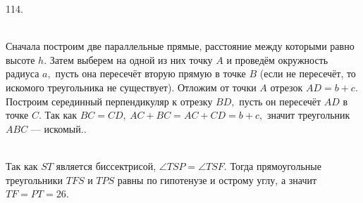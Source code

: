 \documentclass[12pt]{article}
\begin{document}
114. \begin{figure}[ht!]
\end{figure}\\
Сначала построим две параллельные прямые, расстояние между которыми равно высоте $h.$ Затем выберем на одной из них точку $A$ и проведём окружность радиуса $a,$ пусть она пересечёт вторую прямую в точке $B$ (если не пересечёт, то искомого треугольника не существует). Отложим от точки $A$ отрезок $AD=b+c.$ Построим серединный перпендикуляр к отрезку $BD,$ пусть он пересечёт $AD$ в точке $C.$ Так как $BC=CD,\ AC+BC=AC+CD=b+c,$ значит треугольник $ABC$ --- искомый.\newpage{}. \begin{figure}[ht!]
\end{figure}\\
Так как $ST$ является биссектрисой, $\angle TSP=\angle TSF.$ Тогда прямоугольные треугольники $TFS$ и $TPS$ равны по гипотенузе и острому углу, а значит $TF=PT=26.$\\
\end{document}
